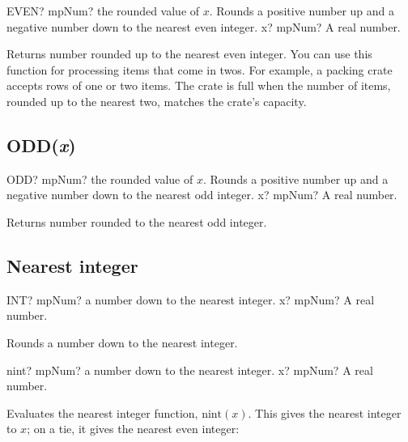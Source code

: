 \begin{mpFunctionsExtract}
	\mpWorksheetFunctionOneNotImplemented
	{EVEN? mpNum? the rounded value of $x$. Rounds a positive number up and a negative number down to the nearest even integer.}
	{x? mpNum? A real number.}
\end{mpFunctionsExtract}

\vspace{0.3cm}
Returns number rounded up to the nearest even integer. You can use this function for processing items that come in twos. For example, a packing crate accepts rows of one or two items. The crate is full when the number of items, rounded up to the nearest two, matches the crate's capacity.




\subsection{ODD(\textit{x})}

\begin{mpFunctionsExtract}
	\mpWorksheetFunctionOneNotImplemented
	{ODD? mpNum? the rounded value of $x$. Rounds a positive number up and a negative number down to the nearest odd integer.}
	{x? mpNum? A real number.}
\end{mpFunctionsExtract}

\vspace{0.3cm}
Returns number rounded to the nearest odd integer.




\subsection{Nearest integer}

\begin{mpFunctionsExtract}
	\mpWorksheetFunctionOneNotImplemented
	{INT? mpNum?  a number down to the nearest integer.}
	{x? mpNum? A real number.}
\end{mpFunctionsExtract}

\vspace{0.3cm}
Rounds a number down to the nearest integer.



\begin{mpFunctionsExtract}
	\mpFunctionOne
	{nint? mpNum?  a number down to the nearest integer.}
	{x? mpNum? A real number.}
\end{mpFunctionsExtract}


\vpara
Evaluates the nearest integer function, $\text{nint}(x)$. This gives the nearest integer to $x$; on a tie, it gives the nearest even integer:

